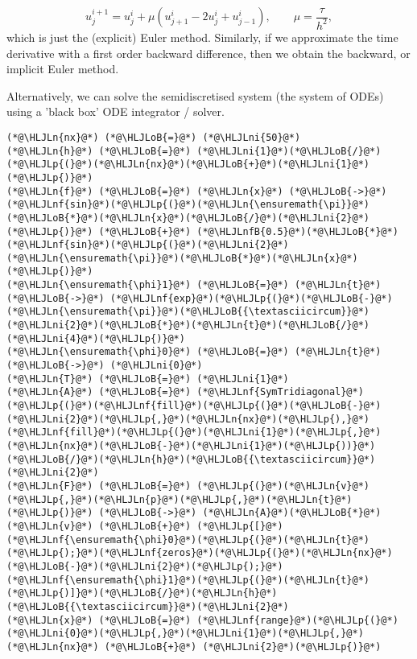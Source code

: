 \documentclass[12pt,landscape]{article}
\newcommand{\HLJLn}[1]{#1}
\newcommand{\HLJLnf}[1]{\textcolor[RGB]{66,102,213}{#1}}
\newcommand{\HLJLnfB}[1]{\textcolor[RGB]{59,151,46}{#1}}
\newcommand{\HLJLni}[1]{\textcolor[RGB]{59,151,46}{#1}}
\newcommand{\HLJLoB}[1]{\textcolor[RGB]{102,102,102}{\textbf{#1}}}
\newcommand{\HLJLp}[1]{#1}
\begin{document}
{\[
u^{i+1}_j = u^i_j + \mu\left(u^i_{j+1} - 2u^i_j + u^i_{j-1}   \right), \qquad \mu = \frac{\tau}{h^2},
\]
which is just the (explicit) Euler method.   Similarly, if we approximate the time derivative with a first order backward difference, then we obtain the backward, or implicit Euler method. 

Alternatively, we can solve the semidiscretised system (the system of ODEs) using a 'black box' ODE integrator / solver.


\begin{lstlisting}
(*@\HLJLn{nx}@*) (*@\HLJLoB{=}@*) (*@\HLJLni{50}@*)
(*@\HLJLn{h}@*) (*@\HLJLoB{=}@*) (*@\HLJLni{1}@*)(*@\HLJLoB{/}@*)(*@\HLJLp{(}@*)(*@\HLJLn{nx}@*)(*@\HLJLoB{+}@*)(*@\HLJLni{1}@*)(*@\HLJLp{)}@*)
(*@\HLJLn{f}@*) (*@\HLJLoB{=}@*) (*@\HLJLn{x}@*) (*@\HLJLoB{->}@*) (*@\HLJLnf{sin}@*)(*@\HLJLp{(}@*)(*@\HLJLn{\ensuremath{\pi}}@*)(*@\HLJLoB{*}@*)(*@\HLJLn{x}@*)(*@\HLJLoB{/}@*)(*@\HLJLni{2}@*)(*@\HLJLp{)}@*) (*@\HLJLoB{+}@*) (*@\HLJLnfB{0.5}@*)(*@\HLJLoB{*}@*)(*@\HLJLnf{sin}@*)(*@\HLJLp{(}@*)(*@\HLJLni{2}@*)(*@\HLJLn{\ensuremath{\pi}}@*)(*@\HLJLoB{*}@*)(*@\HLJLn{x}@*)(*@\HLJLp{)}@*)
(*@\HLJLn{\ensuremath{\phi}1}@*) (*@\HLJLoB{=}@*) (*@\HLJLn{t}@*) (*@\HLJLoB{->}@*) (*@\HLJLnf{exp}@*)(*@\HLJLp{(}@*)(*@\HLJLoB{-}@*)(*@\HLJLn{\ensuremath{\pi}}@*)(*@\HLJLoB{{\textasciicircum}}@*)(*@\HLJLni{2}@*)(*@\HLJLoB{*}@*)(*@\HLJLn{t}@*)(*@\HLJLoB{/}@*)(*@\HLJLni{4}@*)(*@\HLJLp{)}@*)
(*@\HLJLn{\ensuremath{\phi}0}@*) (*@\HLJLoB{=}@*) (*@\HLJLn{t}@*) (*@\HLJLoB{->}@*) (*@\HLJLni{0}@*)
(*@\HLJLn{T}@*) (*@\HLJLoB{=}@*) (*@\HLJLni{1}@*)
(*@\HLJLn{A}@*) (*@\HLJLoB{=}@*) (*@\HLJLnf{SymTridiagonal}@*)(*@\HLJLp{(}@*)(*@\HLJLnf{fill}@*)(*@\HLJLp{(}@*)(*@\HLJLoB{-}@*)(*@\HLJLni{2}@*)(*@\HLJLp{,}@*)(*@\HLJLn{nx}@*)(*@\HLJLp{),}@*)(*@\HLJLnf{fill}@*)(*@\HLJLp{(}@*)(*@\HLJLni{1}@*)(*@\HLJLp{,}@*)(*@\HLJLn{nx}@*)(*@\HLJLoB{-}@*)(*@\HLJLni{1}@*)(*@\HLJLp{))}@*)(*@\HLJLoB{/}@*)(*@\HLJLn{h}@*)(*@\HLJLoB{{\textasciicircum}}@*)(*@\HLJLni{2}@*)
(*@\HLJLn{F}@*) (*@\HLJLoB{=}@*) (*@\HLJLp{(}@*)(*@\HLJLn{v}@*)(*@\HLJLp{,}@*)(*@\HLJLn{p}@*)(*@\HLJLp{,}@*)(*@\HLJLn{t}@*)(*@\HLJLp{)}@*) (*@\HLJLoB{->}@*) (*@\HLJLn{A}@*)(*@\HLJLoB{*}@*)(*@\HLJLn{v}@*) (*@\HLJLoB{+}@*) (*@\HLJLp{[}@*)(*@\HLJLnf{\ensuremath{\phi}0}@*)(*@\HLJLp{(}@*)(*@\HLJLn{t}@*)(*@\HLJLp{);}@*)(*@\HLJLnf{zeros}@*)(*@\HLJLp{(}@*)(*@\HLJLn{nx}@*)(*@\HLJLoB{-}@*)(*@\HLJLni{2}@*)(*@\HLJLp{);}@*)(*@\HLJLnf{\ensuremath{\phi}1}@*)(*@\HLJLp{(}@*)(*@\HLJLn{t}@*)(*@\HLJLp{)]}@*)(*@\HLJLoB{/}@*)(*@\HLJLn{h}@*)(*@\HLJLoB{{\textasciicircum}}@*)(*@\HLJLni{2}@*)
(*@\HLJLn{x}@*) (*@\HLJLoB{=}@*) (*@\HLJLnf{range}@*)(*@\HLJLp{(}@*)(*@\HLJLni{0}@*)(*@\HLJLp{,}@*)(*@\HLJLni{1}@*)(*@\HLJLp{,}@*)(*@\HLJLn{nx}@*) (*@\HLJLoB{+}@*) (*@\HLJLni{2}@*)(*@\HLJLp{)}@*)

\end{lstlisting}}
\end{document}
